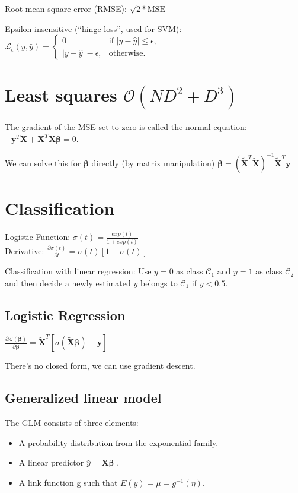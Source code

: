 \documentclass[10pt,a4paper,landscape]{article}
\renewcommand{\bf}[1]{\ensuremath{\mathbf{#1}}}
\newcommand{\bbeta}{\boldsymbol\beta}
\begin{document}
\begin{multicols*}{4}
Root mean square error (RMSE): $\sqrt{2 * \text{MSE}}$

Epsilon insensitive (``hinge loss'', used for SVM):
$\mathcal{L}_{\epsilon}(y, \hat{y}) = \begin{cases}
0                   & \text{if } |y - \hat y| \le \epsilon, \\
|y - \hat y| - \epsilon, & \text{otherwise.}
\end{cases}$

\section{Least squares \small$\mathcal{O}(ND^2 + D^3)$}
The gradient of the MSE set to zero is called the normal equation:
$ - \bf{y}^T \bf{X} + \bf{X}^T \bf{X} \bbeta = 0$.

We can solve this for $\bbeta$ directly (by matrix manipulation)
$\bbeta = ( \bf{\tilde{X}}^T \bf{\tilde{X}} )^{-1} \bf{\tilde{X}}^T \bf{y}$

\section{Classification}
Logistic Function: $\sigma(t) = \frac{exp(t)}{1+exp(t)}$\\
Derivative: $\frac{ \partial\sigma(t) }{ \partial t } = \sigma(t)[ 1 - \sigma(t) ]$

Classification with linear regression: Use $y = 0$ as class $\mathcal{C}_1$
and $y = 1$ as class $\mathcal{C}_2$ and then decide a newly estimated $y$ belongs
to $\mathcal{C}_1$ if $y < 0.5$.

\subsection{Logistic Regression}
$\frac{ \partial\mathcal{L}(\bbeta) }{ \partial \bbeta } = \tilde{\bf{X}}^T [\sigma(\tilde{\bf{X}} \bbeta) - \bf{y}]$

There's no closed form, we can use gradient descent.

\subsection{Generalized linear model}
The GLM consists of three elements:
\begin{itemize}
  \item A probability distribution from the exponential family.
  \item A linear predictor $\hat y = \bf{X} \bbeta$ .
  \item A link function g such that $E(y) = \mu = g^{-1}(\eta)$.
\end{itemize}


\end{multicols*}
\end{document}
